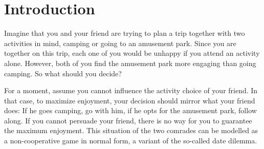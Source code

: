 \documentclass[a4paper,11pt,reqno,english]{amsart}
\theoremstyle{plain}
\theoremstyle{definition}
\begin{document}
\begin{abstract}
	To illustrate the relevance of the newly introduced notions we conclude with two applications. The first shows that there exist games with multilateral equilibria in the family of finite games, thereby opening the door for new fundamental research possibilities in this particularly intensely researched subfield of game theory. The second application expands the classical work of Nobel laureates Kenneth Arrow \& G\'erard Debreu from 1954, which modelled the state economy consisting of producers, consumers and the state itself. We show that the classical microeconomic assumptions are sufficient for the state to be able to ensure the existence of arbitrarily high-lateral Nash equilibria in its economy.
\end{abstract}
\maketitle

\vspace{-2em}


\section*{Introduction}


Imagine that you and your friend are trying to plan a trip together with two activities in mind, camping or going to an amusement park.
Since you are together on this trip, each one of you would be unhappy if you attend an activity alone.
However, both of you find the amusement park more engaging than going camping.
So what should you decide?

\medskip
For a moment, assume you cannot influence the activity choice of your friend.
In that case, to maximize enjoyment, your decision should mirror what your friend does: If he goes camping, go with him, if he opts for the amusement park, follow along.
If you cannot persuade your friend, there is no way for you to guarantee the maximum enjoyment.
This situation of the two comrades can be modelled as a non-cooperative game in normal form, a variant of the so-called date dilemma.
\end{document}
